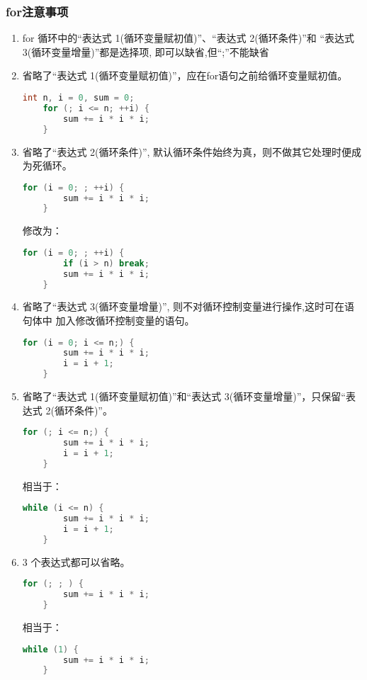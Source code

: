 \documentclass[cjk,slidestop,mathserif,hyperref={CJKbookmarks=true}]{beamer}
\begin{document}
\begin{CJK*}{UTF8}{gkai}
\begin{frame}
    \frametitle{for注意事项}
    \begin{enumerate}
        \item for 循环中的“表达式 1(循环变量赋初值)”、“表达式 2(循环条件)”和
        “表达式 3(循环变量增量)”都是选择项, 即可以缺省,但“;”不能缺省
        \item 省略了“表达式 1(循环变量赋初值)”，应在for语句之前给循环变量赋初值。
            \begin{lstlisting}[language=c]
    int n, i = 0, sum = 0;
    for (; i <= n; ++i) {
        sum += i * i * i;
    }
            \end{lstlisting}
        \item 省略了“表达式 2(循环条件)”, 默认循环条件始终为真，则不做其它处理时便成为死循环。
            \begin{lstlisting}[language=c]
    for (i = 0; ; ++i) {
        sum += i * i * i;
    }
            \end{lstlisting}
            修改为：
            \begin{lstlisting}[language=c]
    for (i = 0; ; ++i) {
        if (i > n) break;
        sum += i * i * i;
    }
            \end{lstlisting}
        \item 省略了“表达式 3(循环变量增量)”, 则不对循环控制变量进行操作,这时可在语句体中
加入修改循环控制变量的语句。
            \begin{lstlisting}[language=c]
    for (i = 0; i <= n;) {
        sum += i * i * i;
        i = i + 1;
    }
            \end{lstlisting}
        \item 省略了“表达式 1(循环变量赋初值)”和“表达式 3(循环变量增量)”，只保留“表达式 2(循环条件)”。
            \begin{lstlisting}[language=c]
    for (; i <= n;) {
        sum += i * i * i;
        i = i + 1;
    }
            \end{lstlisting}
            相当于：
            \begin{lstlisting}[language=c]
    while (i <= n) {
        sum += i * i * i;
        i = i + 1;
    }
            \end{lstlisting}
        \item 3 个表达式都可以省略。
            \begin{lstlisting}[language=c]
    for (; ; ) {
        sum += i * i * i;
    }
            \end{lstlisting}
            相当于：
            \begin{lstlisting}[language=c]
    while (1) {
        sum += i * i * i;
    }
            \end{lstlisting}
    \end{enumerate}
\end{frame}


\end{CJK*}
\end{document}
